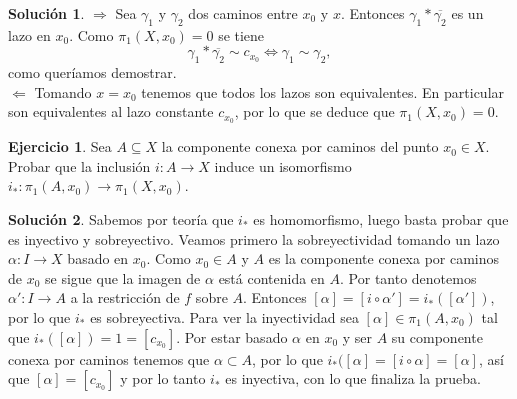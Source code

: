 \documentclass{article}
\theoremstyle{plain}
\theoremstyle{definition}
\newtheorem{exercise}{Ejercicio}
\newtheorem*{sol*}{Solución}
\begin{document}
\begin{sol*}
$\boxed{\Rightarrow}$ Sea $\gamma_1$ y $\gamma_2$ dos caminos entre $x_0$ y $x$. Entonces $\gamma_1*\overline{\gamma_2}$ es un lazo en $x_0$. Como $\pi_1(X,x_0)=0$ se tiene
\[
\gamma_1*\overline{\gamma_2}\sim c_{x_0}\Leftrightarrow \gamma_1\sim\gamma_2,
\]
como queríamos demostrar.\\
$\boxed{\Leftarrow}$ Tomando $x=x_0$ tenemos que todos los lazos son equivalentes. En particular son equivalentes al lazo constante $c_{x_0}$, por lo que se deduce que $\pi_1(X,x_0)=0$.
\end{sol*}


\newpage \begin{exercise} Sea $A\subseteq X$ la componente conexa por caminos del punto $x_0\in X$. Probar que la inclusión
$i: A\to X$ induce un isomorfismo $i_*: \pi_1(A,x_0) \to \pi_1(X,x_0)$.
\end{exercise}
\begin{sol*}
Sabemos por teoría que $i_*$ es homomorfismo, luego basta probar que es inyectivo y sobreyectivo. Veamos primero la sobreyectividad tomando un lazo $\alpha:I\to X$ basado en $x_0$. Como $x_0\in A$ y $A$ es la componente conexa por caminos de $x_0$ se sigue que la imagen de $\alpha$ está contenida en $A$. Por tanto denotemos $\alpha':I\to A$ a la restricción de $f$ sobre $A$. Entonces $[\alpha]=[i\circ \alpha']=i_*([\alpha'])$, por lo que $i_*$ es sobreyectiva. Para ver la inyectividad sea $[\alpha]\in \pi_1(A,x_0)$ tal que $i_*([\alpha])=1=[c_{x_0}]$. Por estar basado $\alpha$ en $x_0$ y ser $A$ su componente conexa por caminos tenemos que $\alpha\subset A$, por lo que $i_*([\alpha]=[i\circ\alpha]=[\alpha]$, así que $[\alpha]=[c_{x_0}]$ y por lo tanto $i_*$ es inyectiva, con lo que finaliza la prueba. 
\end{sol*}

\newpage 
\end{document}
